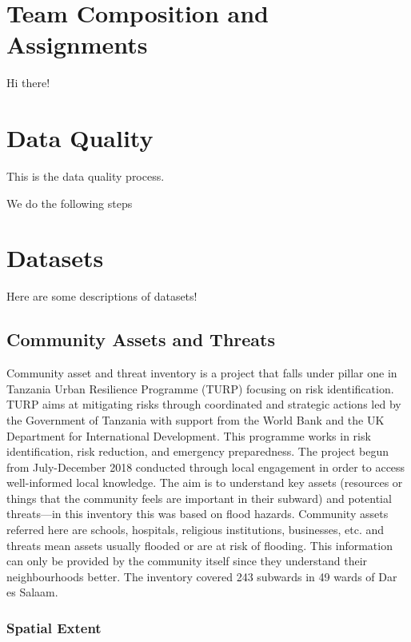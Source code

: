 \documentclass[a4paper,12pt,twoside]{article}
\begin{document}
\section{Team Composition and Assignments}
Hi there!

\section{Data Quality}
This is the data quality process. 

We do the following steps


\section{Datasets}
Here are some descriptions of datasets!

\newpage
\subsection{Community Assets and Threats}

\begin{multicols}{2}
Community asset and threat inventory is a project that falls under pillar one in Tanzania Urban Resilience Programme (TURP) focusing on risk identification. TURP aims at mitigating risks through coordinated and strategic actions led by the Government of Tanzania with support from the World Bank and the UK Department for International Development. This programme works in risk identification, risk reduction, and emergency preparedness.
The project begun from July-December 2018  conducted through local engagement  in order to access well-informed local knowledge. The aim is to understand key assets (resources or things that the community feels are important in their subward) and potential threats---in this inventory this was based on flood hazards. Community assets referred here are schools, hospitals, religious institutions, businesses, etc. and threats mean assets usually flooded or are at risk of flooding. This information can only be provided by the community itself since they understand their neighbourhoods better. The inventory covered  243 subwards in 49 wards of Dar es Salaam. 
\end{multicols}

\subsubsection{Spatial Extent}
\end{document}
